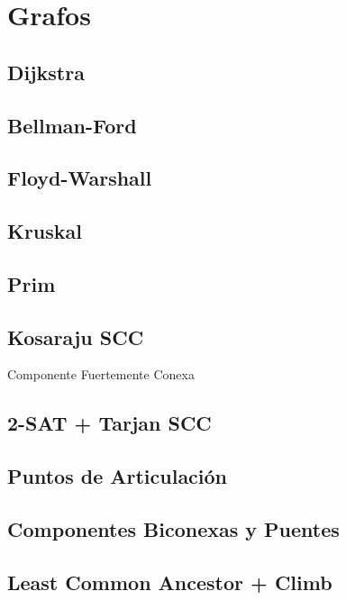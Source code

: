 \newpage
\section{Grafos}
\subsection{Dijkstra}

\subsection{Bellman-Ford}

\subsection{Floyd-Warshall}

\subsection{Kruskal}

\subsection{Prim}

\subsection{Kosaraju SCC}
Componente Fuertemente Conexa

\subsection{2-SAT + Tarjan SCC}

\newpage
\subsection{Puntos de Articulaci\'on}

\subsection{Componentes Biconexas y Puentes}

\subsection{Least Common Ancestor + Climb}

